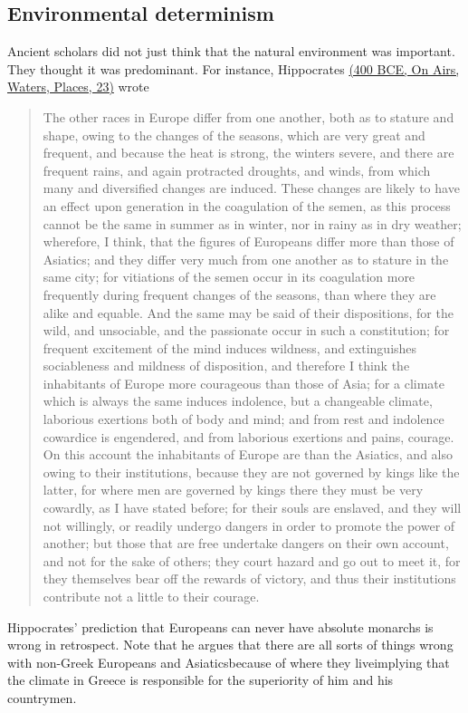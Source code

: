\subsection{Environmental determinism}
Ancient scholars did not just think that the natural environment was important. They thought it was predominant. For instance, Hippocrates \href{http://classics.mit.edu/Hippocrates/airwatpl.23.23.html}{(400 BCE, On Airs, Waters, Places, 23)} wrote
\begin{quote}
The other races in Europe differ from one another, both as to stature and shape, owing to the changes of the seasons, which are very great and frequent, and because the heat is strong, the winters severe, and there are frequent rains, and again protracted droughts, and winds, from which many and diversified changes are induced. These changes are likely to have an effect upon generation in the coagulation of the semen, as this process cannot be the same in summer as in winter, nor in rainy as in dry weather; wherefore, I think, that the figures of Europeans differ more than those of Asiatics; and they differ very much from one another as to stature in the same city; for vitiations of the semen occur in its coagulation more frequently during frequent changes of the seasons, than where they are alike and equable. And the same may be said of their dispositions, for the wild, and unsociable, and the passionate occur in such a constitution; for frequent excitement of the mind induces wildness, and extinguishes sociableness and mildness of disposition, and therefore I think the inhabitants of Europe more courageous than those of Asia; for a climate which is always the same induces indolence, but a changeable climate, laborious exertions both of body and mind; and from rest and indolence cowardice is engendered, and from laborious exertions and pains, courage. On this account the inhabitants of Europe are than the Asiatics, and also owing to their institutions, because they are not governed by kings like the latter, for where men are governed by kings there they must be very cowardly, as I have stated before; for their souls are enslaved, and they will not willingly, or readily undergo dangers in order to promote the power of another; but those that are free undertake dangers on their own account, and not for the sake of others; they court hazard and go out to meet it, for they themselves bear off the rewards of victory, and thus their institutions contribute not a little to their courage.
\end{quote}
Hippocrates' prediction that Europeans can never have absolute monarchs is wrong in retrospect. Note that he argues that there are all sorts of things wrong with non-Greek Europeans and Asiatics\textemdash because of where they live\textemdash implying that the climate in Greece is responsible for the superiority of him and his countrymen.

